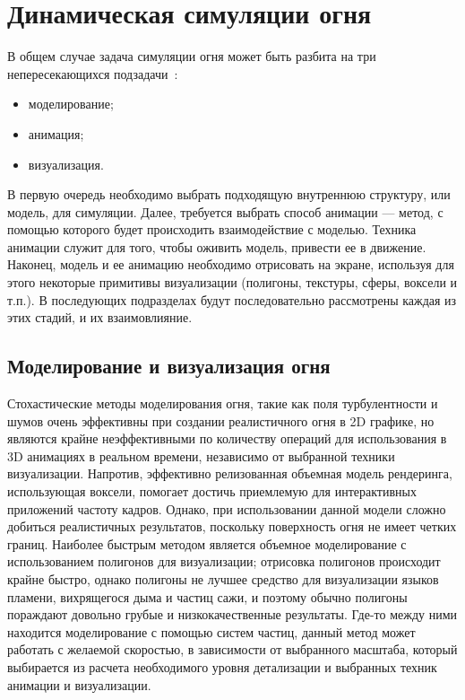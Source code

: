 \section{Динамическая симуляции огня}

В общем случае задача симуляции огня может быть разбита на три
непересекающихся подзадачи~\cite{Perry94synthesizingflames}:
\begin{itemize}
	\item моделирование;
	\item анимация;
	\item визуализация.
\end{itemize}

В первую очередь необходимо выбрать подходящую внутреннюю структуру, или модель,
для симуляции. Далее, требуется выбрать способ анимации --- метод, с помощью
которого будет происходить взаимодействие с моделью. Техника анимации служит для
того, чтобы оживить модель, привести ее в движение. Наконец, модель и ее
анимацию необходимо отрисовать на экране, используя для этого некоторые
примитивы визуализации (полигоны, текстуры, сферы, воксели и т.п.). В
последующих подразделах будут последовательно рассмотрены каждая из этих стадий,
и их взаимовлияние.

\subsection{Моделирование и визуализация огня}

Стохастические методы моделирования огня, такие как поля турбулентности и шумов
очень эффективны при создании реалистичного огня в 2D графике, но являются
крайне неэффективными по количеству операций для использования в 3D анимациях в
реальном времени, независимо от выбранной техники визуализации. Напротив,
эффективно релизованная объемная модель рендеринга, использующая воксели,
помогает достичь приемлемую для интерактивных приложений частоту кадров. Однако,
при использовании данной модели сложно добиться реалистичных результатов,
поскольку поверхность огня не имеет четких границ. Наиболее быстрым методом
является объемное моделирование с использованием полигонов для визуализации;
отрисовка полигонов происходит крайне быстро, однако полигоны не лучшее средство
для визуализации языков пламени, вихрящегося дыма и частиц сажи, и поэтому
обычно полигоны пораждают довольно грубые и низкокачественные результаты. Где-то
между ними находится моделирование с помощью систем частиц, данный метод может
работать с желаемой скоростью, в зависимости от выбранного масштаба, который
выбирается из расчета необходимого уровня детализации и выбранных техник
анимации и визуализации.
